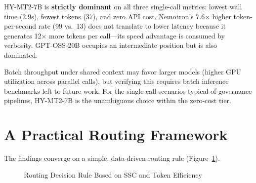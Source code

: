 \documentclass[11pt,a4paper]{article}
\begin{document}
HY-MT2-7B is \textbf{strictly dominant} on all three single-call metrics: lowest wall time (2.9s), fewest tokens (37), and zero API cost. Nemotron's 7.6$\times$ higher token-per-second rate (99 vs.\ 13) does not translate to lower latency because it generates 12$\times$ more tokens per call---its speed advantage is consumed by verbosity. GPT-OSS-20B occupies an intermediate position but is also dominated.

Batch throughput under shared context may favor larger models (higher GPU utilization across parallel calls), but verifying this requires batch inference benchmarks left to future work. For the single-call scenarios typical of governance pipelines, HY-MT2-7B is the unambiguous choice within the zero-cost tier.

\section{A Practical Routing Framework}

The findings converge on a simple, data-driven routing rule (Figure~\ref{fig:routing}).

\begin{figure}[htbp]\centering\small
{}
\caption{Routing Decision Rule Based on SSC and Token Efficiency}\label{fig:routing}
\end{figure}
\end{document}
